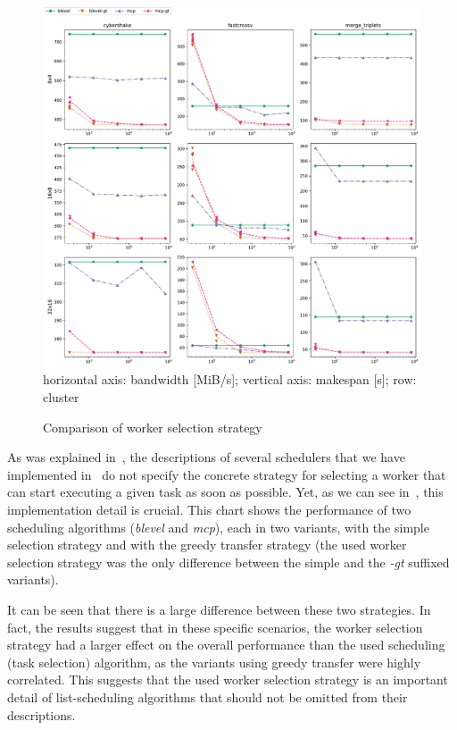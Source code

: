 \begin{figure}
	\centering
	\includegraphics[width=\textwidth]{imgs/estee/charts/gt-scheduler}\\
	{\small horizontal axis: bandwidth [MiB/s]; vertical axis:
	makespan [s]; row: cluster}
	\caption{Comparison of worker selection strategy}
	\label{fig:estee-chart-gt-scheduler}
\end{figure}

As was explained in~, the descriptions of several schedulers that we have
implemented in~\estee{} do not specify the concrete strategy for selecting a worker
that can start executing a given task as soon as possible. Yet, as we can see
in~, this implementation detail is crucial. This chart shows the performance
of two scheduling algorithms (\emph{blevel} and \emph{mcp}), each in two
variants, with the simple selection strategy and with the greedy transfer strategy (the used worker
selection strategy was the only difference between the simple and the \emph{-gt}
suffixed variants).

It can be seen that there is a large difference between these two strategies. In fact, the results
suggest that in these specific scenarios, the worker selection strategy had a larger effect on the
overall performance than the used scheduling (task selection) algorithm, as the variants using
greedy transfer were highly correlated. This suggests that the used worker selection strategy is an
important detail of list-scheduling algorithms that should not be omitted from their descriptions.

